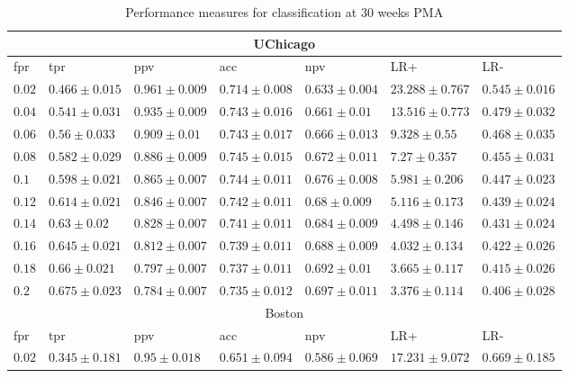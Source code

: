\documentclass[onecolumn,10pt]{IEEEtran}
\begin{document}
\def\HCOL{Green3!50}
\begin{table}[t]
\centering
\caption{Performance measures for classification at 30 weeks PMA}
\label{tbl:performance_chi30}

\begin{tabular}{lllllll}
\toprule
\multicolumn{7}{c}{UChicago}\\
\midrule
   fpr &               tpr &               ppv &               acc &               npv &                LR+ &               LR- \\
\midrule
$0.02$ & $0.466 \pm 0.015$ & $0.961 \pm 0.009$ & $0.714 \pm 0.008$ & $0.633 \pm 0.004$ & $23.288 \pm 0.767$ & $0.545 \pm 0.016$ \\
$0.04$ & $0.541 \pm 0.031$ & $0.935 \pm 0.009$ & $0.743 \pm 0.016$ &  $0.661 \pm 0.01$ & $13.516 \pm 0.773$ & $0.479 \pm 0.032$ \\
$0.06$ &  $0.56 \pm 0.033$ &  $0.909 \pm 0.01$ & $0.743 \pm 0.017$ & $0.666 \pm 0.013$ &   $9.328 \pm 0.55$ & $0.468 \pm 0.035$ \\
$0.08$ & $0.582 \pm 0.029$ & $0.886 \pm 0.009$ & $0.745 \pm 0.015$ & $0.672 \pm 0.011$ &   $7.27 \pm 0.357$ & $0.455 \pm 0.031$ \\
 $0.1$ & $0.598 \pm 0.021$ & $0.865 \pm 0.007$ & $0.744 \pm 0.011$ & $0.676 \pm 0.008$ &  $5.981 \pm 0.206$ & $0.447 \pm 0.023$ \\
$0.12$ & $0.614 \pm 0.021$ & $0.846 \pm 0.007$ & $0.742 \pm 0.011$ &  $0.68 \pm 0.009$ &  $5.116 \pm 0.173$ & $0.439 \pm 0.024$ \\
$0.14$ &   $0.63 \pm 0.02$ & $0.828 \pm 0.007$ & $0.741 \pm 0.011$ & $0.684 \pm 0.009$ &  $4.498 \pm 0.146$ & $0.431 \pm 0.024$ \\
$0.16$ & $0.645 \pm 0.021$ & $0.812 \pm 0.007$ & $0.739 \pm 0.011$ & $0.688 \pm 0.009$ &  $4.032 \pm 0.134$ & $0.422 \pm 0.026$ \\
$0.18$ &  $0.66 \pm 0.021$ & $0.797 \pm 0.007$ & $0.737 \pm 0.011$ &  $0.692 \pm 0.01$ &  $3.665 \pm 0.117$ & $0.415 \pm 0.026$ \\
 $0.2$ & $0.675 \pm 0.023$ & $0.784 \pm 0.007$ & $0.735 \pm 0.012$ & $0.697 \pm 0.011$ &  $3.376 \pm 0.114$ & $0.406 \pm 0.028$ \\
\midrule
\multicolumn{7}{c}{Boston}\\
\midrule
   fpr &               tpr &               ppv &               acc &               npv &                LR+ &               LR- \\
\midrule
$0.02$ & $0.345 \pm 0.181$ &  $0.95 \pm 0.018$ & $0.651 \pm 0.094$ & $0.586 \pm 0.069$ & $17.231 \pm 9.072$ & $0.669 \pm 0.185$ \\

\end{tabular}
\end{table}
\end{document}
